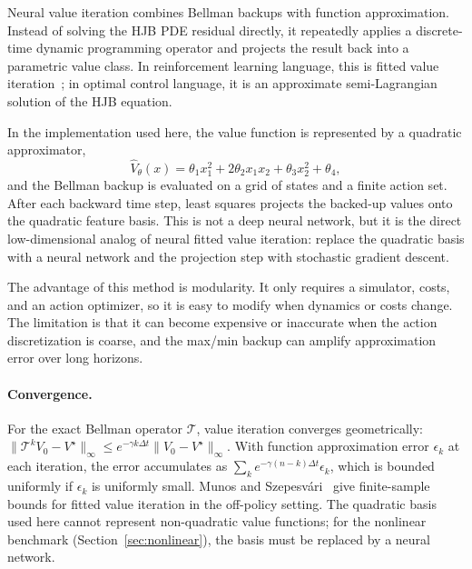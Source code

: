 Neural value iteration combines Bellman backups with function approximation. Instead of solving the HJB PDE residual directly, it repeatedly applies a discrete-time dynamic programming operator and projects the result back into a parametric value class. In reinforcement learning language, this is fitted value iteration~\cite{munos2008finite}; in optimal control language, it is an approximate semi-Lagrangian solution of the HJB equation.

In the implementation used here, the value function is represented by a quadratic approximator,
\begin{equation}
\hat V_\theta(x)=\theta_1x_1^2+2\theta_2x_1x_2+\theta_3x_2^2+\theta_4,
\end{equation}
and the Bellman backup is evaluated on a grid of states and a finite action set. After each backward time step, least squares projects the backed-up values onto the quadratic feature basis. This is not a deep neural network, but it is the direct low-dimensional analog of neural fitted value iteration: replace the quadratic basis with a neural network and the projection step with stochastic gradient descent.

The advantage of this method is modularity. It only requires a simulator, costs, and an action optimizer, so it is easy to modify when dynamics or costs change. The limitation is that it can become expensive or inaccurate when the action discretization is coarse, and the max/min backup can amplify approximation error over long horizons.

\paragraph{Convergence.}
For the exact Bellman operator $\mathcal{T}$, value iteration converges
geometrically: $\|\mathcal{T}^k V_0 - V^\star\|_\infty\leq
e^{-\gamma k\Delta t}\|V_0-V^\star\|_\infty$.
With function approximation error $\epsilon_k$ at each iteration,
the error accumulates as $\sum_k e^{-\gamma(n-k)\Delta t}\epsilon_k$,
which is bounded uniformly if $\epsilon_k$ is uniformly small.
Munos and Szepesv\'{a}ri~\cite{munos2008finite} give finite-sample
bounds for fitted value iteration in the off-policy setting.
The quadratic basis used here cannot represent non-quadratic value
functions; for the nonlinear benchmark (Section~\ref{sec:nonlinear}),
the basis must be replaced by a neural network.
